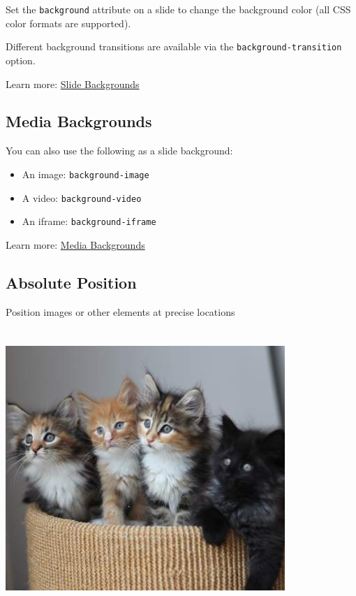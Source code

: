 \documentclass[
  letterpaper,
  DIV=11,
  numbers=noendperiod]{scrartcl}
\begin{document}
Set the \texttt{background} attribute on a slide to change the
background color (all CSS color formats are supported).

Different background transitions are available via the
\texttt{background-transition} option.

Learn more:
\href{https://quarto.org/docs/presentations/revealjs/\#color-backgrounds}{Slide
Backgrounds}

\hypertarget{media-backgrounds}{%
\subsection{Media Backgrounds}\label{media-backgrounds}}

You can also use the following as a slide background:

\begin{itemize}
\item
  An image: \texttt{background-image}
\item
  A video: \texttt{background-video}
\item
  An iframe: \texttt{background-iframe}
\end{itemize}

Learn more:
\href{https://quarto.org/docs/presentations/revealjs/\#image-backgrounds}{Media
Backgrounds}

\hypertarget{absolute-position}{%
\subsection{Absolute Position}\label{absolute-position}}

Position images or other elements at precise locations

\includegraphics[width=4.16667in,height=4.16667in]{mini/images/kitten-400-350.jpeg}
\end{document}
